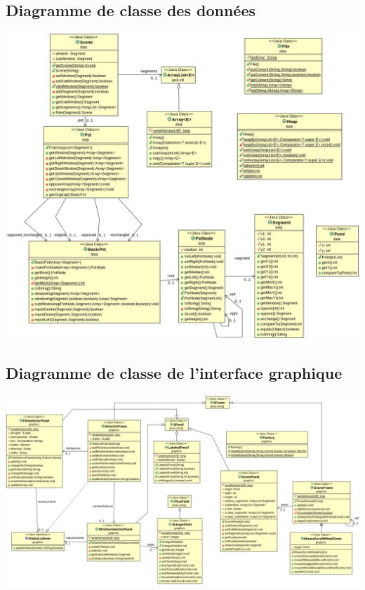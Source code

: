 \documentclass[10pt,a4paper]{article}
\begin{document}
\subsection{Diagramme de classe des données}
\includegraphics[scale=0.35]{../src/UML/data.png}

\subsection{Diagramme de classe de l'interface graphique}
\includegraphics[scale=0.25]{../src/UML/graphics.png}
\end{document}
